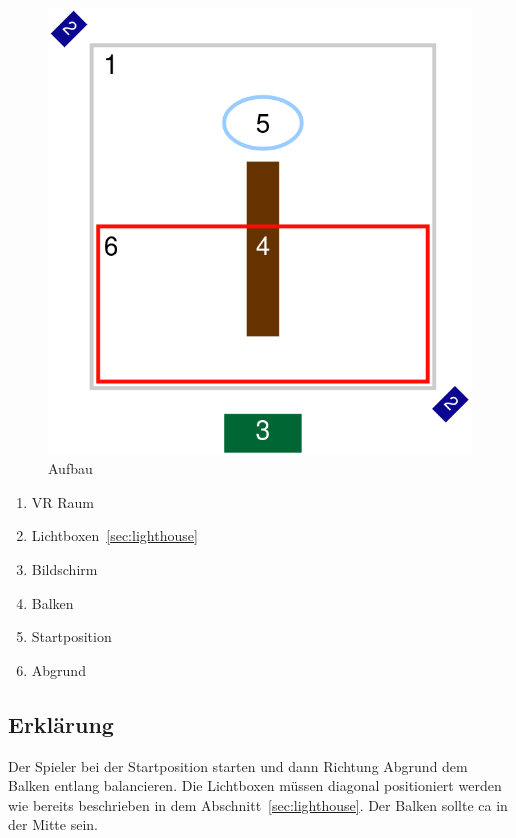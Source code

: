 \begin{figure}
    \centering
    \includegraphics[scale=0.5]{pics/assemlbly}
    \caption{Aufbau}
    \label{fig:assembly}
\end{figure}

\begin{enumerate}
    \item VR Raum
    \item Lichtboxen~\ref{sec:lighthouse}
    \item Bildschirm
    \item Balken
    \item Startposition
    \item Abgrund
\end{enumerate}

\subsection{Erklärung}\label{subsec:description}

Der Spieler bei der Startposition starten und dann Richtung Abgrund dem Balken entlang balancieren.
Die Lichtboxen müssen diagonal positioniert werden wie bereits beschrieben in dem Abschnitt~\ref{sec:lighthouse}.
Der Balken sollte ca in der Mitte sein.

